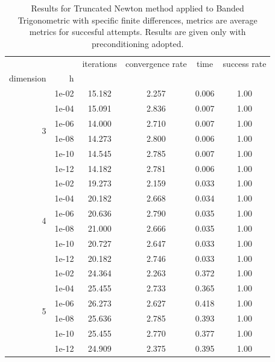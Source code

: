 \begin{table}
\centering
\caption{Results for Truncated Newton method applied to Banded Trigonometric with specific finite differences, metrics are average metrics for succesful attempts. Results are given only with preconditioning adopted.}
\label{tab:Truncated_Newton_Banded_Trigonometric_fd_rel}
\begin{tabular}{rr|cccc}
\toprule
    &  & iterations & convergence rate & time & success rate \\
dimension & h &  &  &  &  \\
\midrule
\multirow[t]{6}{*}{3} & 1e-02 & 15.182 & 2.257 & 0.006 & 1.00 \\
    & 1e-04 & 15.091 & 2.836 & 0.007 & 1.00 \\
    & 1e-06 & 14.000 & 2.710 & 0.007 & 1.00 \\
    & 1e-08 & 14.273 & 2.800 & 0.006 & 1.00 \\
    & 1e-10 & 14.545 & 2.785 & 0.007 & 1.00 \\
    & 1e-12 & 14.182 & 2.781 & 0.006 & 1.00 \\
\cline{1-6}
\multirow[t]{6}{*}{4} & 1e-02 & 19.273 & 2.159 & 0.033 & 1.00 \\
    & 1e-04 & 20.182 & 2.668 & 0.034 & 1.00 \\
    & 1e-06 & 20.636 & 2.790 & 0.035 & 1.00 \\
    & 1e-08 & 21.000 & 2.666 & 0.035 & 1.00 \\
    & 1e-10 & 20.727 & 2.647 & 0.033 & 1.00 \\
    & 1e-12 & 20.182 & 2.746 & 0.033 & 1.00 \\
\cline{1-6}
\multirow[t]{6}{*}{5} & 1e-02 & 24.364 & 2.263 & 0.372 & 1.00 \\
    & 1e-04 & 25.455 & 2.733 & 0.365 & 1.00 \\
    & 1e-06 & 26.273 & 2.627 & 0.418 & 1.00 \\
    & 1e-08 & 25.636 & 2.785 & 0.393 & 1.00 \\
    & 1e-10 & 25.455 & 2.770 & 0.377 & 1.00 \\
    & 1e-12 & 24.909 & 2.375 & 0.395 & 1.00 \\
\cline{1-6}
\bottomrule
\end{tabular}
\end{table}